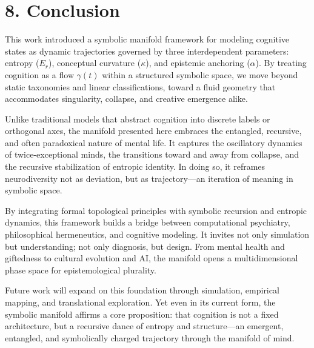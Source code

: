 \section*{8. Conclusion}

This work introduced a symbolic manifold framework for modeling cognitive states as dynamic trajectories governed by three interdependent parameters: entropy ($E_r$), conceptual curvature ($\kappa$), and epistemic anchoring ($\alpha$). By treating cognition as a flow $\gamma(t)$ within a structured symbolic space, we move beyond static taxonomies and linear classifications, toward a fluid geometry that accommodates singularity, collapse, and creative emergence alike.

Unlike traditional models that abstract cognition into discrete labels or orthogonal axes, the manifold presented here embraces the entangled, recursive, and often paradoxical nature of mental life. It captures the oscillatory dynamics of twice-exceptional minds, the transitions toward and away from collapse, and the recursive stabilization of entropic identity. In doing so, it reframes neurodiversity not as deviation, but as trajectory—an iteration of meaning in symbolic space.

By integrating formal topological principles with symbolic recursion and entropic dynamics, this framework builds a bridge between computational psychiatry, philosophical hermeneutics, and cognitive modeling. It invites not only simulation but understanding; not only diagnosis, but design. From mental health and giftedness to cultural evolution and AI, the manifold opens a multidimensional phase space for epistemological plurality.

Future work will expand on this foundation through simulation, empirical mapping, and translational exploration. Yet even in its current form, the symbolic manifold affirms a core proposition: that cognition is not a fixed architecture, but a recursive dance of entropy and structure—an emergent, entangled, and symbolically charged trajectory through the manifold of mind.